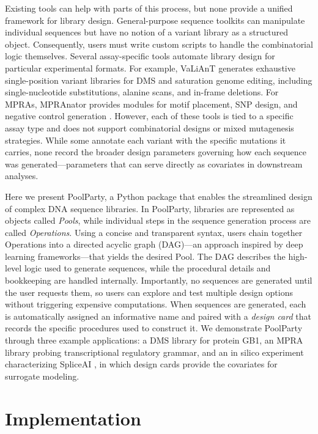 \documentclass[pdflatex,sn-vancouver-num,referee,lineno,oneside]{sn-jnl}
\begin{document}
Existing tools can help with parts of this process, but none provide a unified framework for library design. General-purpose sequence toolkits \citep{Cock2009df, Pereira2015wj, Klie2023kg, Schreiber2025nd} can manipulate individual sequences but have no notion of a variant library as a structured object. Consequently, users must write custom scripts to handle the combinatorial logic themselves. Several assay-specific tools automate library design for particular experimental formats. For example, VaLiAnT \citep{Barbon2022th} generates exhaustive single-position variant libraries for DMS and saturation genome editing, including single-nucleotide substitutions, alanine scans, and in-frame deletions. For MPRAs, MPRAnator \citep{GeorgakopoulosSoares2017gb} provides modules for motif placement, SNP design, and negative control generation \citep[see also][]{Ghazi2018aa}. However, each of these tools is tied to a specific assay type and does not support combinatorial designs or mixed mutagenesis strategies. While some annotate each variant with the specific mutations it carries, none record the broader design parameters governing how each sequence was generated---parameters that can serve directly as covariates in downstream analyses.

Here we present PoolParty, a Python package that enables the streamlined design of complex DNA sequence libraries. In PoolParty, libraries are represented as objects called \emph{Pools}, while individual steps in the sequence generation process are called \emph{Operations}. Using a concise and transparent syntax, users chain together Operations into a directed acyclic graph (DAG)---an approach inspired by deep learning frameworks---that yields the desired Pool. The DAG describes the high-level logic used to generate sequences, while the procedural details and bookkeeping are handled internally. Importantly, no sequences are generated until the user requests them, so users can explore and test multiple design options without triggering expensive computations. When sequences are generated, each is automatically assigned an informative name and paired with a \emph{design card} that records the specific procedures used to construct it. We demonstrate PoolParty through three example applications: a DMS library for protein GB1, an MPRA library probing transcriptional regulatory grammar, and an in silico experiment characterizing SpliceAI \citep{Jaganathan2019ps}, in which design cards provide the covariates for surrogate modeling.

\section{Implementation}\label{sec:implementation}
\end{document}
